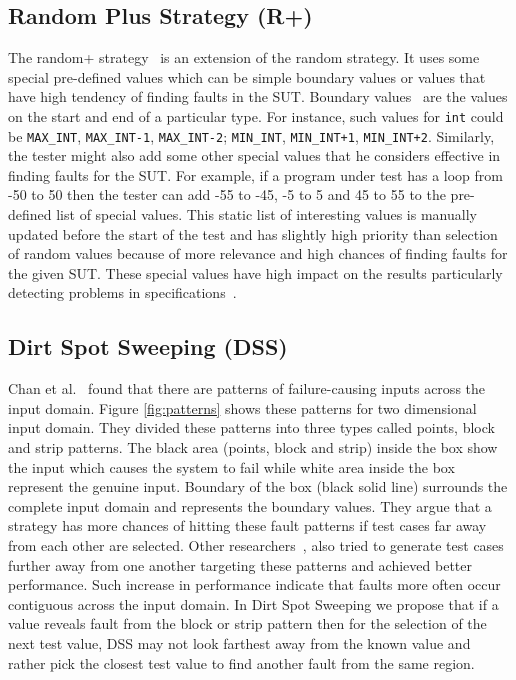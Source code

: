 \documentclass{acm_proc_article-sp}
\begin{document}
\subsection{Random Plus Strategy (R+)}
The random+ strategy~\cite{Leitner2007} is an extension of the random strategy. It uses some special pre-defined values which can be simple boundary values or values that have high tendency of finding faults in the SUT. Boundary values~\cite{Beizer1990} are the values on the start and end of a particular type. For instance, such values for \verb+int+ could be \verb+MAX_INT+, \verb+MAX_INT-1+, \verb+MAX_INT-2+; \verb+MIN_INT+, \verb-MIN_INT+1-, \verb-MIN_INT+2-. Similarly, the tester might also add some other special values that he considers effective in finding faults for the SUT. For example, if a program under test has a loop from -50 to 50 then the tester can add -55 to -45, -5 to 5 and 45 to 55 to the pre-defined list of special values. This static list of interesting values is manually updated before the start of the test and has slightly high priority than selection of random values because of more relevance and high chances of finding faults for the given SUT. These special values have high impact on the results particularly detecting problems in specifications~\cite{Ciupa2008}.


\subsection{Dirt Spot Sweeping (DSS)}
Chan et al.~\cite{Chan1996} found that there are patterns of failure-causing inputs across the input domain. Figure \ref{fig:patterns} shows these patterns for two dimensional input domain. They divided these patterns into three types called points, block and strip patterns. The black area (points, block and strip) inside the box show the input which causes the system to fail while white area inside the box represent the genuine input. Boundary of the box (black solid line) surrounds the complete input domain and represents the boundary values. They argue that a strategy has more chances of hitting these fault patterns if test cases far away from each other are selected. Other researchers~\cite{Chan2002, Chen2003, Chen2005}, also tried to generate test cases further away from one another targeting these patterns and achieved better performance. Such increase in performance indicate that faults more often occur contiguous across the input domain. In Dirt Spot Sweeping we propose that if a value reveals fault from the block or strip pattern then for the selection of the next test value, DSS may not look farthest away from the known value and rather pick the closest test value to find another fault from the same region.
\end{document}
